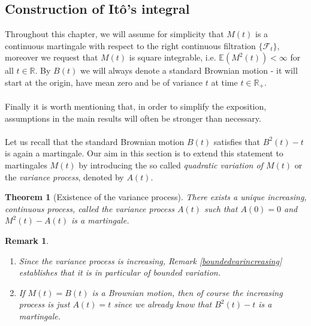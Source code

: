 \documentclass[11pt,a4paper, final]{article}
\newtheorem{thm}{Theorem}[section]
\newtheorem{rem}{Remark}[defn]
\begin{document}
\subsection{Construction of Itô's integral}
Throughout this chapter, we will assume for simplicity that $M(t)$ is a continuous martingale with respect to the right continuous filtration $\lbrace \mathcal{F}_t \rbrace$, moreover we request that $M(t)$ is square integrable, i.e. $\mathbb{E}(M^2(t)) < \infty$ for all $t \in \mathbb{R}$. By $B(t)$ we will always denote a standard Brownian motion - it will start at the origin, have mean zero and be of variance $t$ at time $t \in \mathbb{R}_+$. 
\\\\
 Finally it is worth mentioning that, in order to simplify the exposition, assumptions in the main results will often be stronger than necessary. 
\\
\\ 
Let us recall that the standard Brownian motion $B(t)$ satisfies that $B^2(t)-t$ is again a martingale. 
Our aim in this section is to extend this statement to martingales $M(t)$ by introducing the so called \textit{quadratic variation of $M(t)$} or the \textit{variance process}, denoted by $A(t)$.
\begin{thm}[Existence of the variance process] \label{variancethm}
There exists a unique increasing, continuous process, called the variance process $A(t)$ such that $A(0)=0$ and $M^2(t)-A(t)$ is a martingale.
\end{thm}
\begin{rem} \label{varianceprocessofBM}  \
\begin{enumerate} 
\item Since the variance process is increasing, Remark \ref{boundedvarincreasing} establishes that it is in particular of bounded variation. 
\item If $M(t)=B(t)$ is a Brownian motion, then of course the increasing process is just $A(t)=t$ since we already know that $B^2(t)-t$ is a martingale.
\end{enumerate} 
\end{rem}
\end{document}
